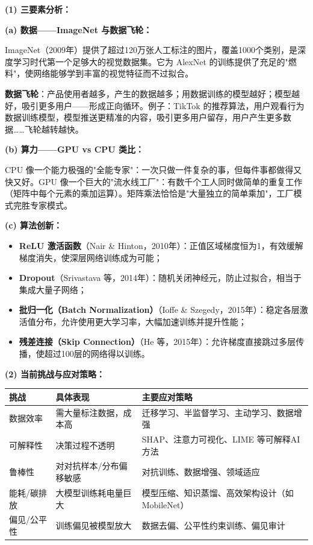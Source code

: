 \documentclass[a4paper,11pt]{ctexart}
\begin{document}
\begin{solutionbox}[参考答案与详细解析]
    \textbf{(1) 三要素分析：}

    \textbf{(a) 数据——ImageNet 与数据飞轮：}

    ImageNet（2009年）提供了超过120万张人工标注的图片，覆盖1000个类别，是深度学习时代第一个足够大的视觉数据集。它为 AlexNet 的训练提供了充足的"燃料"，使网络能够学到丰富的视觉特征而不过拟合。

    \textbf{数据飞轮}：产品使用者越多，产生的数据越多；用数据训练的模型越好；模型越好，吸引更多用户——形成正向循环。例子：TikTok 的推荐算法，用户观看行为数据训练模型，模型推送更精准的内容，吸引更多用户留存，用户产生更多数据……飞轮越转越快。

    \textbf{(b) 算力——GPU vs CPU 类比：}

    CPU 像一个能力极强的"全能专家"：一次只做一件复杂的事，但每件事都做得又快又好。GPU 像一个巨大的"流水线工厂"：有数千个工人同时做简单的重复工作（矩阵中每个元素的乘加运算）。矩阵乘法恰恰是"大量独立的简单乘加"，工厂模式完胜专家模式。

    \textbf{(c) 算法创新：}
    \begin{itemize}
        \item \textbf{ReLU 激活函数}（Nair \& Hinton，2010年）：正值区域梯度恒为1，有效缓解梯度消失，使深层网络训练成为可能；
        \item \textbf{Dropout}（Srivastava 等，2014年）：随机关闭神经元，防止过拟合，相当于集成大量子网络；
        \item \textbf{批归一化（Batch Normalization）}（Ioffe \& Szegedy，2015年）：稳定各层激活值分布，允许使用更大学习率，大幅加速训练并提升性能；
        \item \textbf{残差连接（Skip Connection）}（He 等，2015年）：允许梯度直接跳过多层传播，使超过100层的网络得以训练。
    \end{itemize}

    \textbf{(2) 当前挑战与应对策略：}

    \begin{center}
    \begin{tabular}{p{2.5cm} p{3.8cm} p{4.3cm}}
        \toprule
        挑战 & 具体表现 & 主要应对策略 \\
        \midrule
        数据效率 & 需大量标注数据，成本高 & 迁移学习、半监督学习、主动学习、数据增强 \\[0.8em]
        可解释性 & 决策过程不透明 & SHAP、注意力可视化、LIME 等可解释AI方法 \\[0.8em]
        鲁棒性 & 对对抗样本/分布偏移敏感 & 对抗训练、数据增强、领域适应 \\[0.8em]
        能耗/碳排放 & 大模型训练耗电量巨大 & 模型压缩、知识蒸馏、高效架构设计（如MobileNet） \\[0.8em]
        偏见/公平性 & 训练偏见被模型放大 & 数据去偏、公平性约束训练、偏见审计 \\
        \bottomrule
    \end{tabular}
    \end{center}


\end{solutionbox}
\end{document}
